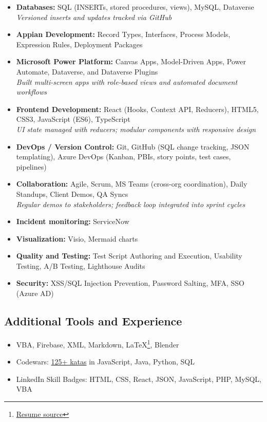 \documentclass{article}
\begin{document}
\begin{itemize}
  \item \textbf{Databases:} SQL (INSERTs, stored procedures, views), MySQL, Dataverse\\
  \textit{Versioned inserts and updates tracked via GitHub}
  
  \item \textbf{Appian Development:} Record Types, Interfaces, Process Models, Expression Rules, Deployment Packages
  
  \item \textbf{Microsoft Power Platform:} Canvas Apps, Model-Driven Apps, Power Automate, Dataverse, and Dataverse Plugins\\
  \textit{Built multi-screen apps with role-based views and automated document workflows}
  
  \item \textbf{Frontend Development:} React (Hooks, Context API, Reducers), HTML5, CSS3, JavaScript (ES6), TypeScript\\
  \textit{UI state managed with reducers; modular components with responsive design}
  
  \item \textbf{DevOps / Version Control:} Git, GitHub (SQL change tracking, JSON templating), Azure DevOps (Kanban, PBIs, story points, test cases, pipelines)
  
  \item \textbf{Collaboration:} Agile, Scrum, MS Teams (cross-org coordination), Daily Standups, Client Demos, QA Syncs\\
  \textit{Regular demos to stakeholders; feedback loop integrated into sprint cycles}

  \item \textbf{Incident monitoring:} ServiceNow

  \item \textbf{Visualization:} Visio, Mermaid charts
  
  \item \textbf{Quality and Testing:} Test Script Authoring and Execution, Usability Testing, A/B Testing, Lighthouse Audits

  \item \textbf{Security:} XSS/SQL Injection Prevention, Password Salting, MFA, SSO (Azure AD)
\end{itemize}

\vspace{0.5em}
\subsection*{Additional Tools and Experience}
\begin{itemize}
  \item VBA, Firebase, XML, Markdown, \LaTeX\footnote{\href{https://github.com/sirkoik/CurriculumVitae/blob/master/source/main/resume.tex}{Resume source}}, Blender
  \item Codewars: \href{https://www.codewars.com/users/sirkoik}{125+ katas} in JavaScript, Java, Python, SQL
  \item LinkedIn Skill Badges: HTML, CSS, React, JSON, JavaScript, PHP, MySQL, VBA
\end{itemize}
\end{document}
